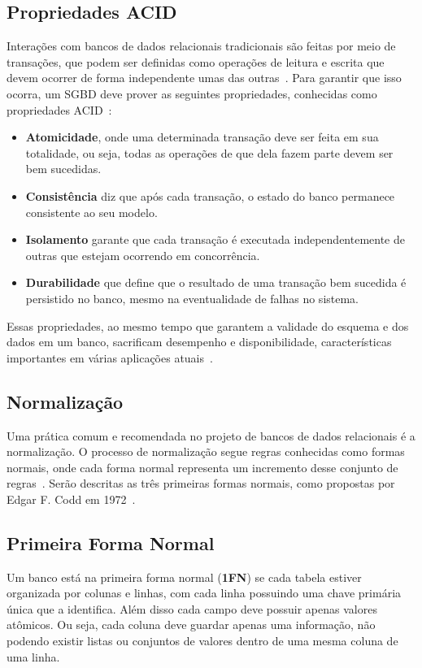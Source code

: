 \subsection{Propriedades ACID}
Interações com bancos de dados relacionais tradicionais são feitas por meio de transações, que podem ser definidas como operações de leitura e escrita que devem ocorrer de forma independente umas das outras~\cite{dmsbook}. Para garantir que isso ocorra, um SGBD deve prover as seguintes propriedades, conhecidas como propriedades ACID~\cite{haerder}:
\begin{itemize}
	\item \textbf{Atomicidade}, onde uma determinada transação deve ser feita em sua totalidade, ou seja, todas as operações de que dela fazem parte devem ser bem sucedidas.
	\item \textbf{Consistência} diz que após cada transação, o estado do banco permanece consistente ao seu modelo.
	\item \textbf{Isolamento} garante que cada transação é executada independentemente de outras que estejam ocorrendo em concorrência.
	\item \textbf{Durabilidade} que define que o resultado de uma transação bem sucedida é persistido no banco, mesmo na eventualidade de falhas no sistema.
\end{itemize}

Essas propriedades, ao mesmo tempo que garantem a validade do esquema e dos dados em um banco, sacrificam desempenho e disponibilidade, características importantes em várias aplicações atuais~\cite{foxcluster}.

\subsection{Normalização}
Uma prática comum e recomendada no projeto de bancos de dados relacionais é a normalização. O processo de normalização segue regras conhecidas como formas normais, onde cada forma normal representa um incremento desse conjunto de regras~\cite{jan}. Serão descritas as três primeiras formas normais, como propostas por Edgar F. Codd em 1972~\cite{cjdate}.

\subsection*{Primeira Forma Normal}
Um banco está na primeira forma normal (\textbf{1FN}) se cada tabela estiver organizada por colunas e linhas, com cada linha possuindo uma chave primária única que a identifica. 
Além disso cada campo deve possuir apenas valores atômicos. Ou seja, cada coluna deve guardar apenas uma informação, não podendo existir listas ou conjuntos de valores dentro de uma mesma coluna de uma linha.

